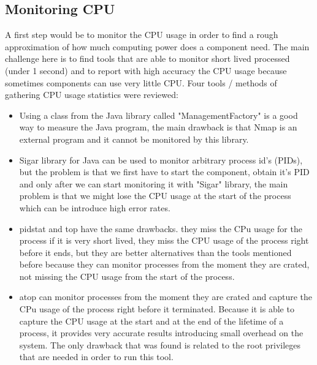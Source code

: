 \documentclass[fleqn,10pt]{./class/wlscirep}
\begin{document}
\subsection{Monitoring CPU}
A first step would be to monitor the CPU usage in order to find a rough approximation of how much computing power does a component need. The main challenge here is to find tools that are able to monitor short lived processed (under 1 second) and to report with high accuracy the CPU usage because sometimes components can use very little CPU. Four tools / methods of gathering CPU usage statistics were reviewed:  
\begin{itemize}
	\item Using a class from the Java library called "ManagementFactory" is a good way to measure the Java program, the main drawback is that Nmap is an external program and it cannot be monitored by this library.
	\item Sigar library for Java can be used to monitor arbitrary process id's (PIDs), but the problem is that we first have to start the component, obtain it's PID and only after we can start monitoring it with "Sigar" library, the main problem is that we might lose the CPU usage at the start of the process which can be introduce high error rates.
	\item pidstat and top have the same drawbacks. they miss the CPu usage for the process if it is very short lived, they miss the CPU usage of the process right before it ends, but they are better alternatives than the tools mentioned before because they can monitor processes from the moment they are crated, not missing the CPU usage from the start of the process.
	\item atop can monitor processes from the moment they are crated and capture the CPu usage of the process right before it terminated. Because it is able to capture the CPU usage at the start and at the end of the lifetime of a process, it provides very accurate results introducing small overhead on the system. The only drawback that was found is related to the root privileges that are needed in order to run this tool.
\end{itemize}
 
\end{document}
